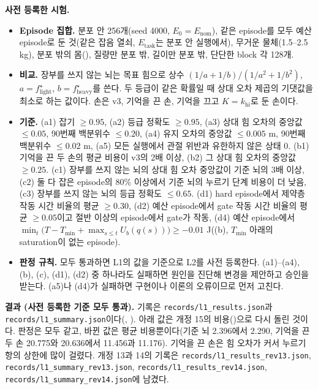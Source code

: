 \documentclass[11pt]{article}\usepackage[margin=1in]{geometry}\usepackage{amsmath,amssymb,amsthm,mathtools}\usepackage{graphicx}\graphicspath{{figures/}{../figures/}{figs/}{./}}\usepackage{enumitem}\usepackage{hyperref}\usepackage{cleveref}\usepackage{tikz}\usetikzlibrary{arrows.meta,positioning,calc,shapes.geometric}\usepackage{float}\usepackage{rotating}\usepackage[most]{tcolorbox}\usepackage{kotex}\usepackage{booktabs}\usepackage{longtable}\emergencystretch=1.6em\tolerance=2000 \crefname{assumption}{Assumption}{Assumptions}\Crefname{assumption}{Assumption}{Assumptions}\crefname{definition}{Definition}{Definitions}\Crefname{definition}{Definition}{Definitions}\crefname{proposition}{Proposition}{Propositions}\Crefname{proposition}{Proposition}{Propositions}\crefname{fact}{Fact}{Facts}\Crefname{fact}{Fact}{Facts} \newtheorem{assumption}{Assumption}\newtheorem{definition}{Definition}\newtheorem{lemma}{Lemma}\newtheorem{proposition}{Proposition}\newtheorem{theorem}{Theorem}\newtheorem{corollary}{Corollary}\newtheorem{fact}{Fact}\theoremstyle{remark}\newtheorem{remark}{Remark} \newcommand{\R}{\mathbb{R}}\newcommand{\xb}{\bar x}\newcommand{\Ab}{\bar A}\newcommand{\By}{\bar B_y}\newcommand{\U}{\mathcal U}\newcommand{\Z}{\mathcal Z}
\begin{document}
\textbf{사전 등록한 시험.}
\begin{itemize}
\item \textbf{Episode 집합.} 분포 안 256개(seed 4000, $E_0=E_{\mathrm{nom}}$), 같은 episode를 모두 예산 episode로 둔 것(같은 잡음 열쇠, $E_{\mathrm{task}}$는 분포 안 실행에서), 무거운 물체(1.5--2.5 kg), 분포 밖의 몸(), 질량만 분포 밖, 길이만 분포 밖, 단단한 block 각 128개.
\item \textbf{비교.} 장부를 쓰지 않는 뇌는 목표 힘으로 상수 $(1/a+1/b)/(1/a^2+1/b^2)$, $a=f^\star_{\mathrm{light}}$, $b=f^\star_{\mathrm{heavy}}$를 쓴다. 두 등급이 같은 확률일 때 상대 오차 제곱의 기댓값을 최소로 하는 값이다. 손은 v3, 기억을 끈 손, 기억을 끄고 $K=k_{\mathrm{hi}}$로 둔 손이다.
\item \textbf{기준.} (a1) 잡기 $\ge0.95$, (a2) 등급 정확도 $\ge0.95$, (a3) 상대 힘 오차의 중앙값 $\le0.05$, 90번째 백분위수 $\le0.20$, (a4) 유지 오차의 중앙값 $\le0.005$ m, 90번째 백분위수 $\le0.02$ m, (a5) 모든 실행에서 관절 위반과 유한하지 않은 상태 0. (b1) 기억을 끈 두 손의 평균 비용이 v3의 2배 이상, (b2) 그 상대 힘 오차의 중앙값 $\ge0.25$. (c1) 장부를 쓰지 않는 뇌의 상대 힘 오차 중앙값이 기준 뇌의 3배 이상, (c2) 둘 다 잡은 episode의 80\% 이상에서 기준 뇌의 누르기 단계 비용이 더 낮음, (c3) 장부를 쓰지 않는 뇌의 등급 정확도 $\le0.65$. (d1) hard episode에서 제약층 작동 시간 비율의 평균 $\ge0.30$, (d2) 예산 episode에서 gate 작동 시간 비율의 평균 $\ge0.05$이고 절반 이상의 episode에서 gate가 작동, (d4) 예산 episode에서 $\min_t\big(T-T_{\min}+\max_{s\le t}U_b(q(s))\big)\ge-0.01$ J((b), $T_{\min}$ 아래의 saturation이 없는 episode).
\item \textbf{판정 규칙.} 모두 통과하면 L1의 값을 기준으로 L2를 사전 등록한다. (a1)--(a4), (b), (c), (d1), (d2) 중 하나라도 실패하면 원인을 진단해 변경을 제안하고 승인을 받는다. (a5)나 (d4)가 실패하면 구현이나 이론의 오류이므로 먼저 고친다.
\end{itemize}

\textbf{결과 (사전 등록한 기준 모두 통과).} 기록은 \texttt{records/l1\_results.json}과 \texttt{records/l1\_summary.json}이다(, ). 아래 값은 개정 15의 비용()으로 다시 돌린 것이다. 판정은 모두 같고, 바뀐 값은 평균 비용뿐이다(기준 뇌 2.396에서 2.290, 기억을 끈 두 손 20.775와 20.636에서 11.456과 11.176). 기억을 끈 손은 힘 오차가 커서 누르기 항의 상한에 많이 걸렸다. 개정 13과 14의 기록은 \texttt{records/l1\_results\_rev13.json}, \texttt{records/l1\_summary\_rev13.json}, \texttt{records/l1\_results\_rev14.json}, \texttt{records/l1\_summary\_rev14.json}에 남겼다.
\end{document}
